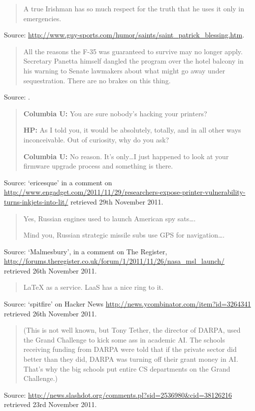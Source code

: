 \documentclass[a4paper]{article}
\begin{document}
\begin{quote}
	A true Irishman has so much respect for the truth that he uses it only in emergencies.
\end{quote}
Source: \url{http://www.guy-sports.com/humor/saints/saint_patrick_blessing.htm}.
\medskip

\begin{quote}
	All the reasons the F-35 was guaranteed to survive may no longer apply.  Secretary Panetta
	himself dangled the program over the hotel balcony in his warning to Senate lawmakers about
	what might go away under sequestration.  There are no brakes on this thing.
\end{quote}
Source: \citet{Ewing2011c}.
\medskip

\begin{quote}
	\textbf{Columbia U:} You are sure nobody's hacking your printers?

	\textbf{HP:} As I told you, it would be absolutely, totally, and in all other ways
		inconceivable.  Out of curiosity, why do you ask?

	\textbf{Columbia U:} No reason. It's only\ldots I just happened to look at your firmware
		upgrade process and something is there. 
\end{quote}
Source: `ericesque' in a comment on \url{http://www.engadget.com/2011/11/29/researchers-expose-printer-vulnerability-turns-inkjets-into-lit/} retrieved 29th November 2011.
\medskip

\begin{quote}
	Yes, Russian engines used to launch American spy sats\ldots.

	Mind you, Russian strategic missile subs use GPS for navigation\ldots.
\end{quote}
Source: `Malmesbury', in a comment on {The Register},
\url{http://forums.theregister.co.uk/forum/1/2011/11/26/nasa_msl_launch/} retrieved 26th November
2011.
\medskip

\begin{quote}
	LaTeX as a service. LaaS has a nice ring to it.
\end{quote}
Source: `spitfire' on Hacker News \url{http://news.ycombinator.com/item?id=3264341} retrieved 26th
November 2011.
\medskip

\begin{quote}
	(This is not well known, but Tony Tether, the director of DARPA, used the Grand Challenge to
kick some ass in academic AI. The schools receiving funding from DARPA were told that if the
private sector did better than they did, DARPA was turning off their grant money in AI. That's why
the big schools put entire CS departments on the Grand Challenge.)
\end{quote}
Source: \url{http://news.slashdot.org/comments.pl?sid=2536980&cid=38126216} retrieved 23rd November
2011.
\medskip
\end{document}
